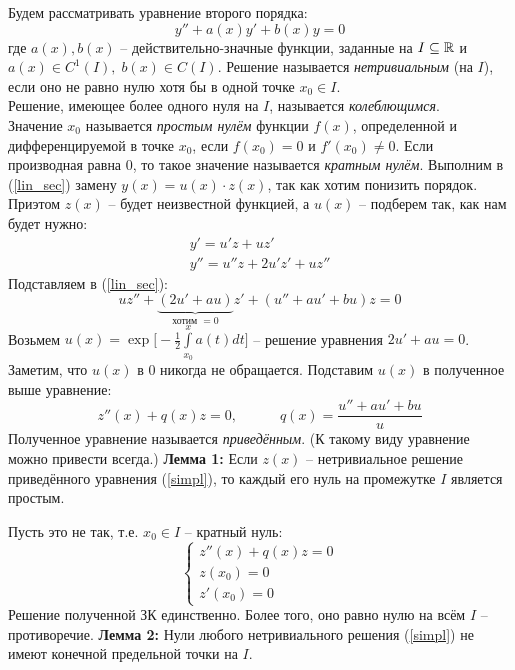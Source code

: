 \setcounter{equation}{0}
Будем рассматривать уравнение второго порядка:
\begin{equation}\label{lin_sec}
    y'' + a(x)y'+b(x)y=0
\end{equation}
где $a(x),b(x)$ -- действительно-значные функции, заданные на $I\subseteq \mathbb{R}$ и $a(x) \in C^1(I), \; b(x)\in C(I)$.
\bigbreak
\noindent \Def  Решение называется \textit{нетривиальным} (на $I$), если оно не равно нулю хотя бы в одной точке $x_0 \in I$.
\\
\Def Решение, имеющее более одного нуля на $I$, называется \textit{колеблющимся}.
\\
\Def Значение $x_0$ называется \textit{простым нулём} функции $f(x)$, определенной и дифференцируемой в точке $x_0$, если $f(x_0) = 0$ и $f'(x_0)\neq 0$. Если производная равна 0, то такое значение называется \textit{кратным нулём}.
\bigbreak
Выполним в (\ref{lin_sec}) замену $y(x) = u(x)\cdot z(x)$, так как хотим понизить порядок. Приэтом $z(x)$ -- будет неизвестной функцией, а $u(x)$ -- подберем так, как нам будет нужно:
\begin{gather*}
    y' = u'z + uz' \\
    y'' = u''z + 2u'z' + uz''
\end{gather*}
Подставляем в (\ref{lin_sec}):
\begin{equation*}
    uz'' + \underbrace{(2u'+au)}_{\text{хотим } =0}z'+(u''+au'+bu)z=0
\end{equation*}
Возьмем $u(x)=\exp\Big[-\frac{1}{2}\int\limits_{x_0}^{x}a(t)dt\Big]$ -- решение уравнения $2u'+au=0$. Заметим, что $u(x)$ в 0 никогда не обращается. Подставим $u(x)$ в полученное выше уравнение:
\begin{equation}\label{simpl}
    z''(x)+q(x)z=0, \qquad \quad q(x)=\frac{u''+au'+bu}{u}
\end{equation}
Полученное уравнение называется \textit{приведённым}. (К такому виду уравнение можно привести всегда.)
\bigbreak
\textbf{Лемма 1:} Если $z(x)$ -- нетривиальное решение приведённого уравнения (\ref{simpl}), то каждый его
нуль на промежутке $I$ является простым.

\Proof Пусть это не так, т.е. $x_0 \in I$ -- кратный нуль:
\begin{equation*}
    \begin{cases}
    z''(x)+q(x)z=0\\
    z(x_0)=0\\
    z'(x_0)=0
    \end{cases}
\end{equation*}
Решение полученной ЗК единственно. Более того, оно равно нулю на всём $I$ --
противоречие.\;\; \EndProof
\bigbreak
\textbf{Лемма 2:} Нули любого нетривиального решения (\ref{simpl}) не имеют конечной предельной точки на $I$.


